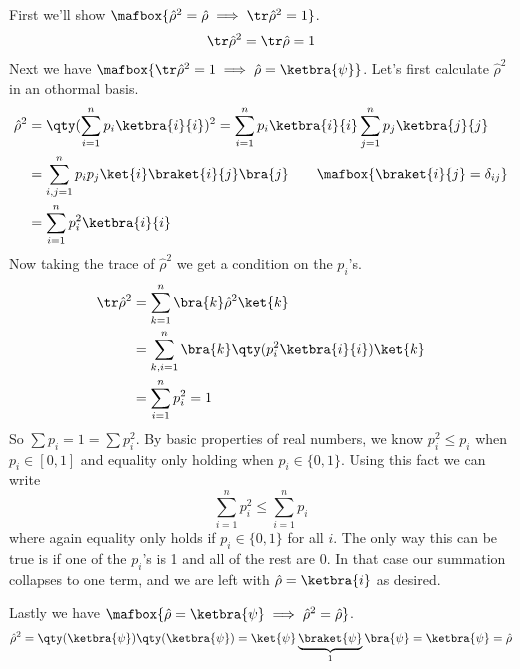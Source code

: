 \documentclass[
	pages,
	boxes,
	color=RoyalPurple
]{homework}
\makeatletter
\numberwithin{tcb@cnt@prob}{section}
\makeatother
\begin{document}
\begin{solution}
    First we'll show $\mafbox{\hat{\rho}^2 = \hat{\rho} \implies \tr\hat{\rho}^2 = 1}$.
    \begin{align*}
        \tr\hat{\rho}^2 = \tr\hat{\rho} = 1
    \end{align*}
    Next we have $\mafbox{\tr\hat{\rho}^2 = 1 \implies \hat{\rho} = \ketbra{\psi}}$.
    Let's first calculate $\hat{\rho}^2$ in an othormal basis.
    \begin{align*}
        \hat{\rho}^2 & = \qty(\sum_{i = 1}^n p_i\ketbra{i}{i})^2 = \sum_{i = 1}^n p_i\ketbra{i}{i}\sum_{j = 1}^n p_j\ketbra{j}{j} \\
                     & = \sum_{i,j = 1}^n p_ip_j\ket{i}\braket{i}{j}\bra{j} \tag*{$\mafbox{\braket{i}{j} = \delta_{ij}}$}         \\
                     & = \sum_{i = 1}^n p_i^2\ketbra{i}{i}
    \end{align*}
    Now taking the trace of $\hat{\rho}^2$ we get a condition on the $p_i$'s.
    \begin{align*}
        \tr \hat{\rho}^2 & = \sum_{k = 1}^n\bra{k}\hat{\rho}^2\ket{k}               \\
                         & = \sum_{k,i = 1}^n\bra{k}\qty(p_i^2\ketbra{i}{i})\ket{k} \\
                         & = \sum_{i = 1}^n p_i^2 = 1
    \end{align*}
    So $\sum p_i = 1 = \sum p_i^2$. By basic properties of real numbers, we know $p_i^2 \leq p_i$ when $p_i\in[0, 1]$ and equality only holding when $p_i \in\{0, 1\}$. Using this fact we can write
    \begin{equation*}
        \sum_{i = 1}^n p_i^2 \leq \sum_{i = 1}^n p_i
    \end{equation*}
    where again equality only holds if $p_i\in\{0, 1\}$ for all $i$. The only way this can be true is if one of the $p_i$'s is 1 and all of the rest are 0. In that case our summation collapses to one term, and we are left with $\hat{\rho} = \ketbra{i}$ as desired.

    Lastly we have $\mafbox{\hat{\rho} = \ketbra{\psi} \implies \hat{\rho}^2 = \hat{\rho}}$.
    \begin{align*}
        \hat{\rho}^2 = \qty(\ketbra{\psi})\qty(\ketbra{\psi}) = \ket{\psi}\underbrace{\braket{\psi}}_{1}\bra{\psi} = \ketbra{\psi} = \hat{\rho}
    \end{align*}

\end{solution}
\end{document}
